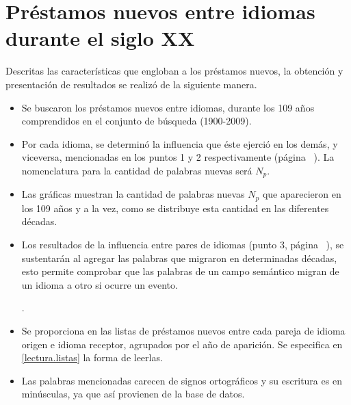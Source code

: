 \section{Préstamos nuevos entre idiomas durante el siglo XX } %

Descritas las características que engloban a los préstamos nuevos, la obtención
y presentación de resultados se realizó de la siguiente manera. 



\begin{itemize}

\item Se buscaron los préstamos nuevos entre idiomas,  durante los 109 años
comprendidos en el conjunto de búsqueda (1900-2009).
	
\item Por cada idioma, se determinó la influencia que éste ejerció en los
demás, y viceversa, mencionadas en los puntos 1 y 2
respectivamente (página ~\pageref{proceso.nuevos}).   La nomenclatura para la
cantidad de palabras nuevas será $N_{p}$.

\item Las gráficas muestran la cantidad de palabras nuevas $N_{p}$ que
aparecieron en los 109 años y a la vez, como se distribuye esta cantidad en las
diferentes décadas. 

\item Los resultados de la influencia entre pares de idiomas (punto 3,
página ~\pageref{proceso.nuevos}), se sustentarán al agregar las palabras
que migraron en determinadas décadas, esto permite comprobar que las palabras de un campo semántico migran de un idioma a otro si ocurre un evento.

. 

\item Se proporciona en \cite{prestamos_nuevos} las listas  de préstamos nuevos
entre cada pareja de idioma origen e idioma receptor, agrupados por el año de
aparición.  Se especifica en \ref{lectura.listas}  la forma de leerlas.

\item Las palabras mencionadas carecen de signos ortográficos y su escritura es en minúsculas, ya que así provienen de la base de datos. 

\end{itemize}

